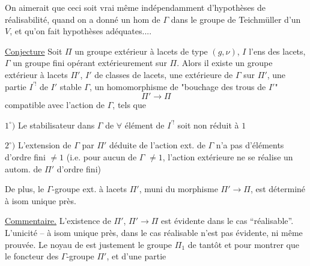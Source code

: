 On aimerait que ceci soit vrai même indépendamment d'hypothèses de réalisabilité,
quand on a donné un hom de $\Gamma$ dans le groupe de Teichmüller d'un $V$,
et qu'on fait  hypothèses adéquates....

\uline{Conjecture} Soit $\Pi$ un groupe extérieur à lacets de type $(g,\nu)$,
$I$ l'ens  des  lacets,
$\Gamma$ un groupe fini opérant extérieurement sur $\Pi$.
Alors il existe un groupe extérieur à lacets $\Pi'$,  $I'$ de classes
de lacets, une  extérieure de $\Gamma$ sur $\Pi'$, une partie
$I^{\prime!}$ de $I'$ stable  $\Gamma$, un homomorphisme 
de "bouchage des trous de $I'$"
\[
\Pi'\longrightarrow\Pi
\]
compatible avec l'action de $\Gamma$, tels que


$1^\circ)$ Le stabilisateur dans $\Gamma$ de $\forall$ élément de $I^{\prime!}$ soit non réduit à $1$

$2^\circ)$ L'extension de $\Gamma$ par $\Pi'$ déduite de l'action ext. de $\Gamma$ n'a pas d'éléments d'ordre fini $\ne 1$ (i.e. pour aucun  de $\Gamma$ $\ne 1$, l'action extérieure  ne se réalise  un autom. de $\Pi'$ d'ordre fini)

De plus, le $\Gamma$-groupe ext. à lacets $\Pi'$, muni du morphisme $\Pi'\longrightarrow\Pi$, est déterminé à isom unique près.

 \uline{Commentaire.} L'existence de $\Pi'$,  $\Pi'\longrightarrow\Pi$ est évidente dans le cas ``réalisable''. L'unicité -- à isom unique près,  dans le cas réalisable n'est pas évidente, ni même prouvée. Le noyau de 
est justement le groupe $\Pi_1$ de tantôt
et pour montrer que le foncteur des   $\Gamma$-groupe  $\Pi'$,  et d'une partie


